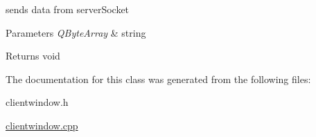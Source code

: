 sends data from server\+Socket 


\begin{DoxyParams}{Parameters}
{\em Q\+Byte\+Array} & string \\
\hline
\end{DoxyParams}
\begin{DoxyReturn}{Returns}
void 
\end{DoxyReturn}


The documentation for this class was generated from the following files\+:\begin{DoxyCompactItemize}
\item 
clientwindow.\+h\item 
\mbox{\hyperlink{clientwindow_8cpp}{clientwindow.\+cpp}}\end{DoxyCompactItemize}
